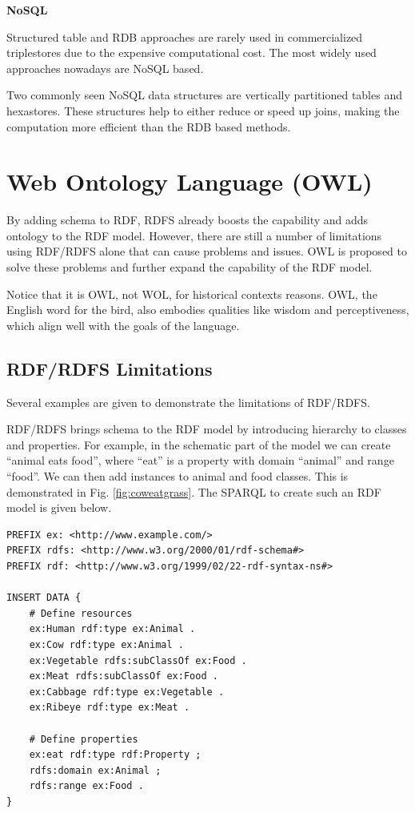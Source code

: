 \vspace{0.1in}
\noindent \textbf{NoSQL}
\vspace{0.1in}

Structured table and RDB approaches are rarely used in commercialized triplestores due to the expensive computational cost. The most widely used approaches nowadays are NoSQL based.

Two commonly seen NoSQL data structures are vertically partitioned tables and hexastores. These structures help to either reduce or speed up joins, making the computation more efficient than the RDB based methods.

\section{Web Ontology Language (OWL)} \label{sec:owl}

By adding schema to RDF, RDFS already boosts the capability and adds ontology to the RDF model. However, there are still a number of limitations using RDF/RDFS alone that can cause problems and issues. OWL is proposed to solve these problems and further expand the capability of the RDF model.

Notice that it is OWL, not WOL, for historical contexts reasons. OWL, the English word for the bird, also embodies qualities like wisdom and perceptiveness, which align well with the goals of the language.

\subsection{RDF/RDFS Limitations} \label{subsec:rdfrdfslimitations}

Several examples are given to demonstrate the limitations of RDF/RDFS.

RDF/RDFS brings schema to the RDF model by introducing hierarchy to classes and properties. For example, in the schematic part of the model we can create ``animal eats food'', where ``eat'' is a property with domain ``animal'' and range ``food''. We can then add instances to animal and food classes. This is demonstrated in Fig. \ref{fig:coweatgrass}. The SPARQL to create such an RDF model is given below.

\begin{lstlisting}
PREFIX ex: <http://www.example.com/>
PREFIX rdfs: <http://www.w3.org/2000/01/rdf-schema#>
PREFIX rdf: <http://www.w3.org/1999/02/22-rdf-syntax-ns#>

INSERT DATA {
	# Define resources
	ex:Human rdf:type ex:Animal .
	ex:Cow rdf:type ex:Animal .
	ex:Vegetable rdfs:subClassOf ex:Food .
	ex:Meat rdfs:subClassOf ex:Food .
	ex:Cabbage rdf:type ex:Vegetable .
	ex:Ribeye rdf:type ex:Meat .
	
	# Define properties
	ex:eat rdf:type rdf:Property ;
	rdfs:domain ex:Animal ;
	rdfs:range ex:Food .
}
\end{lstlisting}

